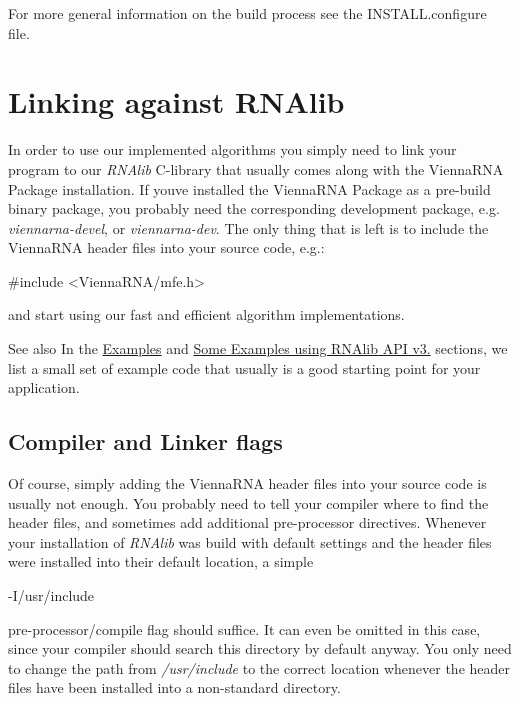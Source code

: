 For more general information on the build process see the I\+N\+S\+T\+A\+L\+L.\+configure file.\hypertarget{install_linking}{}\section{Linking against R\+N\+Alib}\label{install_linking}
In order to use our implemented algorithms you simply need to link your program to our {\itshape R\+N\+Alib} C-\/library that usually comes along with the Vienna\+R\+NA Package installation. If you\textquotesingle{}ve installed the Vienna\+R\+NA Package as a pre-\/build binary package, you probably need the corresponding development package, e.\+g. {\itshape viennarna-\/devel}, or {\itshape viennarna-\/dev}. The only thing that is left is to include the Vienna\+R\+NA header files into your source code, e.\+g.\+:

\begin{DoxyVerb}#include <ViennaRNA/mfe.h>
\end{DoxyVerb}


and start using our fast and efficient algorithm implementations.

\begin{DoxySeeAlso}{See also}
In the \hyperlink{mp_example}{Examples} and \hyperlink{newAPI_newAPI_examples}{Some Examples using R\+N\+Alib A\+PI v3.} sections, we list a small set of example code that usually is a good starting point for your application.
\end{DoxySeeAlso}
\hypertarget{install_linking_flags}{}\subsection{Compiler and Linker flags}\label{install_linking_flags}
Of course, simply adding the Vienna\+R\+NA header files into your source code is usually not enough. You probably need to tell your compiler where to find the header files, and sometimes add additional pre-\/processor directives. Whenever your installation of {\itshape R\+N\+Alib} was build with default settings and the header files were installed into their default location, a simple

\begin{DoxyVerb}-I/usr/include
\end{DoxyVerb}


pre-\/processor/compile flag should suffice. It can even be omitted in this case, since your compiler should search this directory by default anyway. You only need to change the path from {\itshape /usr/include} to the correct location whenever the header files have been installed into a non-\/standard directory.

